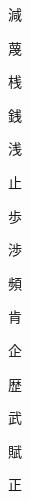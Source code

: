 \begin{spacing}{2.5}
{\Huge \begin{CJK}{UTF8}{min} 減\end{CJK}}\hspace{0.1cm}
{\Huge \begin{CJK}{UTF8}{min} 蔑\end{CJK}}\hspace{0.1cm}
{\Huge \begin{CJK}{UTF8}{min} 桟\end{CJK}}\hspace{0.1cm}
{\Huge \begin{CJK}{UTF8}{min} 銭\end{CJK}}\hspace{0.1cm}
{\Huge \begin{CJK}{UTF8}{min} 浅\end{CJK}}\hspace{0.1cm}
{\Huge \begin{CJK}{UTF8}{min} 止\end{CJK}}\hspace{0.1cm}
{\Huge \begin{CJK}{UTF8}{min} 歩\end{CJK}}\hspace{0.1cm}
{\Huge \begin{CJK}{UTF8}{min} 渉\end{CJK}}\hspace{0.1cm}
{\Huge \begin{CJK}{UTF8}{min} 頻\end{CJK}}\hspace{0.1cm}
{\Huge \begin{CJK}{UTF8}{min} 肯\end{CJK}}\hspace{0.1cm}
{\Huge \begin{CJK}{UTF8}{min} 企\end{CJK}}\hspace{0.1cm}
{\Huge \begin{CJK}{UTF8}{min} 歴\end{CJK}}\hspace{0.1cm}
{\Huge \begin{CJK}{UTF8}{min} 武\end{CJK}}\hspace{0.1cm}
{\Huge \begin{CJK}{UTF8}{min} 賦\end{CJK}}\hspace{0.1cm}
{\Huge \begin{CJK}{UTF8}{min} 正\end{CJK}}\hspace{0.1cm}

\end{spacing}
